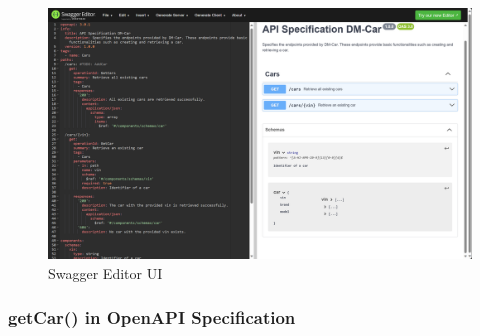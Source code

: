 \begin{figure}
    \centering
    \includegraphics[width=\textwidth]{figures/microservices/dmCar/ms_dmCar_swaggerEditorUI.png}
    \caption{Swagger Editor UI}
    \label{fig:ms_dmCar_swaggerEditorUI}
\end{figure}

\subsubsection*{getCar() in OpenAPI Specification}